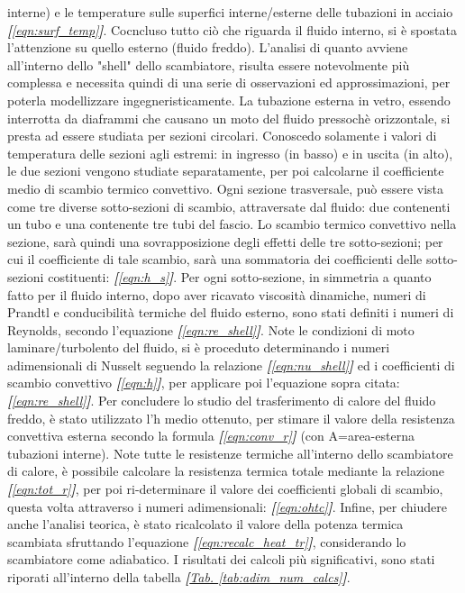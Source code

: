 \documentclass[a4paper,10pt]{article}                                                                                       %
\begin{document}
  interne) e le temperature sulle superfici interne/esterne delle tubazioni in acciaio
  \textit{\textbf{[}\ref{eqn:surf_temp}\textbf{]}}. Cocncluso tutto ciò che riguarda il fluido interno, si è spostata
  l'attenzione su quello esterno (fluido freddo). L'analisi di quanto avviene all'interno dello "shell" dello
  scambiatore, risulta essere notevolmente più complessa e necessita quindi di una serie di osservazioni ed
  approssimazioni, per poterla modellizzare ingegneristicamente. La tubazione esterna in vetro, essendo interrotta da
  diaframmi che causano un moto del fluido pressochè orizzontale, si presta ad essere studiata per sezioni circolari.
  Conoscedo solamente i valori di temperatura delle sezioni agli estremi: in ingresso (in basso) e in uscita (in alto),
  le due sezioni vengono studiate separatamente, per poi calcolarne il coefficiente medio di scambio termico convettivo.
  Ogni sezione trasversale, può essere vista come tre diverse sotto-sezioni di scambio, attraversate dal fluido: due
  contenenti un tubo e una contenente tre tubi del fascio. Lo scambio termico convettivo nella sezione, sarà quindi una
  sovrapposizione degli effetti delle tre sotto-sezioni; per cui il coefficiente di tale scambio, sarà una sommatoria
  dei coefficienti delle sotto-sezioni costituenti: \textit{\textbf{[}\ref{eqn:h_s}\textbf{]}}. Per ogni sotto-sezione,
  in simmetria a quanto fatto per il fluido interno, dopo aver ricavato viscosità dinamiche, numeri di Prandtl e
  conducibilità termiche del fluido esterno, sono stati definiti i numeri di Reynolds, secondo l'equazione
  \textit{\textbf{[}\ref{eqn:re_shell}\textbf{]}}. Note le condizioni di moto laminare/turbolento del fluido, si è
  proceduto determinando i numeri adimensionali di Nusselt seguendo la relazione
  \textit{\textbf{[}\ref{eqn:nu_shell}\textbf{]}} ed i coefficienti di scambio convettivo
  \textit{\textbf{[}\ref{eqn:h}\textbf{]}}, per applicare poi l'equazione sopra citata:
  \textit{\textbf{[}\ref{eqn:re_shell}\textbf{]}}. Per concludere lo studio del trasferimento di calore del fluido freddo,
  è stato utilizzato l'h medio ottenuto, per stimare il valore della resistenza convettiva esterna secondo la formula
  \textit{\textbf{[}\ref{eqn:conv_r}\textbf{]}} (con A=area-esterna tubazioni interne). Note tutte le resistenze termiche
  all'interno dello scambiatore di calore, è possibile calcolare la resistenza termica totale mediante la relazione
  \textit{\textbf{[}\ref{eqn:tot_r}\textbf{]}}, per poi ri-determinare il valore dei coefficienti globali di scambio,
  questa volta attraverso i numeri adimensionali: \textit{\textbf{[}\ref{eqn:ohtc}\textbf{]}}. Infine, per chiudere anche
  l'analisi teorica, è stato ricalcolato il valore della potenza termica scambiata sfruttando l'equazione
  \textit{\textbf{[}\ref{eqn:recalc_heat_tr}\textbf{]}}, considerando lo scambiatore come adiabatico. I risultati dei
  calcoli più significativi, sono stati riporati all'interno della tabella
  \textit{\textbf{[}\hyperref[tab:adim_num_calcs]{Tab. }\ref{tab:adim_num_calcs}\textbf{]}}.
\end{document}
